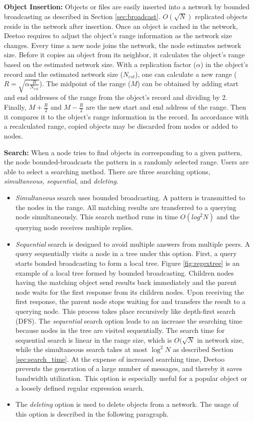 \documentclass[9.5pt,journal,final,finalsubmission,twocolumn]{IEEEtran}
\begin{document}
\textbf{Object Insertion:} Objects or files are easily inserted into a network by 
bounded broadcasting as described in Section \ref{sec:broadcast}. $O(\sqrt{N})$ replicated objects 
reside in the network after insertion. 
Once an object is cached in the network, Deetoo requires to adjust the object's range information 
as the network size changes. Every time a new node joins the network, the node estimates network size. 
Before it copies an object from its neighbor, it calculates the object's range based on the 
estimated network size. With a replication factor ($\alpha$) in the object's record and the 
estimated network size ($N_{est}$), one can calculate a new range ($R=\sqrt{\alpha \frac{B}{N_{est}}}$).
The midpoint of the range ($M$) can be obtained by adding start and end addresses of the 
range from the object's record
and dividing by 2. Finally, $M+\frac{R}{2}$ and $M-\frac{R}{2}$ are the new start and end address 
of the range.
Then it compares it to the object's 
range information in the record. In accordance with a recalculated range, copied objects may be discarded 
from nodes or added to nodes.

\textbf{Search:}
When a node tries to find objects in corresponding to a given pattern, the node bounded-broadcasts 
the pattern in a randomly selected range. 
Users are able to select a searching method. There are three searching options, 
\textit{simultaneous, sequential}, and \textit{deleting}.
\begin{itemize}
\item \textit{Simultaneous} search uses bounded broadcasting. A pattern is transmitted 
to the nodes in the range. All matching results are transferred to a querying 
node simultaneously. This search method runs in time $O(log^2 N)$ and the querying node 
receives multiple replies.
\item \textit{Sequential} search is designed to avoid multiple answers from multiple peers.
A query sequentially visits a node in a tree under this option. 
First, a query starts bonded broadcasting to form a local tree. 
Figure \ref{fig:regextree} is an example of a local tree formed by bounded broadcasting. 
Children nodes having the matching object send results back immediately and the 
parent node waits for the first response from its children nodes. Upon receiving 
the first response, the parent node stops waiting for and transfers the result to a querying 
node. This process takes place recursively like depth-first search (DFS). 
The \textit{sequential} search option leads to an increase the searching time because nodes in the
tree are visited sequentially. The search time for sequential search is linear
in the range size, which is $O(\sqrt{N}$ in network size, while 
the simultaneous search takes at most $\log^2 N$ as described Section \ref{sec:search_time}.
At the expense of increased searching time, Deetoo prevents the generation of a large number of 
messages, and thereby it saves bandwidth utilization.
This option is especially useful for a popular object or a loosely defined regular expression search.
\item The \textit{deleting} option is used to delete objects from a network. 
The usage of this option is described in the following paragraph.
\end{itemize}
\end{document}
